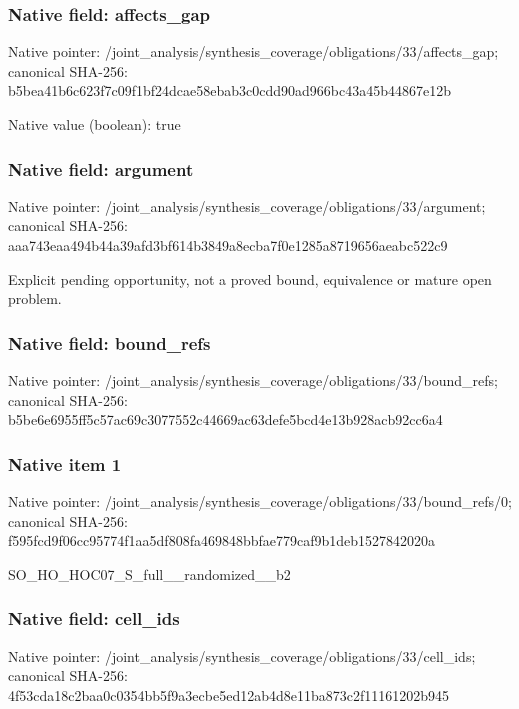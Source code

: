 \documentclass[10pt,a4paper]{article}
\begin{document}
\subsubsection{Native field: affects\_\allowbreak{}gap}
Native pointer: /joint\_\allowbreak{}analysis/synthesis\_\allowbreak{}coverage/obligations/33/affects\_\allowbreak{}gap; canonical SHA-256: b5bea41b6c623f7c09f1bf24dcae58ebab3c0cdd90ad966bc43a45b44867e12b

Native value (boolean): true

\subsubsection{Native field: argument}
Native pointer: /joint\_\allowbreak{}analysis/synthesis\_\allowbreak{}coverage/obligations/33/argument; canonical SHA-256: aaa743eaa494b44a39afd3bf614b3849a8ecba7f0e1285a8719656aeabc522c9

\begingroup\raggedright\sloppy Explicit pending opportunity,\allowbreak{} not a proved bound,\allowbreak{} equivalence or mature open problem.\par\endgroup

\subsubsection{Native field: bound\_\allowbreak{}refs}
Native pointer: /joint\_\allowbreak{}analysis/synthesis\_\allowbreak{}coverage/obligations/33/bound\_\allowbreak{}refs; canonical SHA-256: b5be6e6955ff5c57ac69c3077552c44669ac63defe5bcd4e13b928acb92cc6a4

\subsubsection{Native item 1}
Native pointer: /joint\_\allowbreak{}analysis/synthesis\_\allowbreak{}coverage/obligations/33/bound\_\allowbreak{}refs/0; canonical SHA-256: f595fcd9f06cc95774f1aa5df808fa469848bbfae779caf9b1deb1527842020a

\begingroup\raggedright\sloppy SO\_\allowbreak{}HO\_\allowbreak{}HOC07\_\allowbreak{}S\_\allowbreak{}full\_\allowbreak{}\_\allowbreak{}randomized\_\allowbreak{}\_\allowbreak{}b2\par\endgroup

\subsubsection{Native field: cell\_\allowbreak{}ids}
Native pointer: /joint\_\allowbreak{}analysis/synthesis\_\allowbreak{}coverage/obligations/33/cell\_\allowbreak{}ids; canonical SHA-256: 4f53cda18c2baa0c0354bb5f9a3ecbe5ed12ab4d8e11ba873c2f11161202b945
\end{document}

